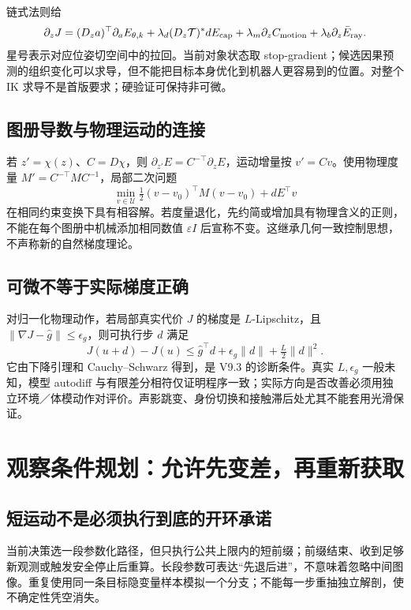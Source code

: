 \documentclass[UTF8,fontset=fandol,11pt,a4paper]{ctexart}
\theoremstyle{plain}
\theoremstyle{definition}
\theoremstyle{remark}
\numberwithin{equation}{section}
\begin{document}
链式法则给
\begin{equation}
\partial_zJ=(D_za)^\top\partial_aE_{\theta,k}
+\lambda_d(D_z\mathcal T)^*dE_{\rm cap}
+\lambda_m\partial_zC_{\rm motion}+\lambda_b\partial_z\bar E_{\rm ray}.
\end{equation}
星号表示对应位姿切空间中的拉回。当前对象状态取 stop-gradient；候选因果预测的组织变化可以求导，但不能把目标本身优化到机器人更容易到的位置。对整个 IK 求导不是首版要求；硬验证可保持非可微。

\subsection{图册导数与物理运动的连接}
若 $z'=\chi(z)$、$C=D\chi$，则 $\partial_{z'}E=C^{-\top}\partial_zE$，运动增量按 $v'=Cv$。使用物理度量 $M'=C^{-\top}MC^{-1}$，局部二次问题
\begin{equation}
\min_{v\in\mathcal U}\tfrac12(v-v_0)^\top M(v-v_0)+dE^\top v
\end{equation}
在相同约束变换下具有相容解。若度量退化，先约简或增加具有物理含义的正则，不能在每个图册中机械添加相同数值 $\varepsilon I$ 后宣称不变。这继承几何一致控制思想，不声称新的自然梯度理论\cite{rmp}。

\subsection{可微不等于实际梯度正确}
对归一化物理动作，若局部真实代价 $J$ 的梯度是 $L$-Lipschitz，且 $\|\nabla J-\widehat g\|\le\epsilon_g$，则可执行步 $d$ 满足
\begin{equation}
J(u+d)-J(u)\le\widehat g^\top d+\epsilon_g\|d\|+\tfrac L2\|d\|^2.
\label{eq:descent}
\end{equation}
它由下降引理和 Cauchy--Schwarz 得到，是 V9.3 的诊断条件。真实 $L,\epsilon_g$ 一般未知，模型 autodiff 与有限差分相符仅证明程序一致；实际方向是否改善必须用独立环境／体模动作对评价。声影跳变、身份切换和接触滞后处尤其不能套用光滑保证。

\section{观察条件规划：允许先变差，再重新获取}
\label{sec:planning}
\subsection{短运动不是必须执行到底的开环承诺}
当前决策选一段参数化路径，但只执行公共上限内的短前缀；前缀结束、收到足够新观测或触发安全停止后重算。长段参数可表达“先退后进”，不意味着忽略中间图像。重复使用同一条目标隐变量样本模拟一个分支；不能每一步重抽独立解剖，使不确定性凭空消失。
\end{document}
